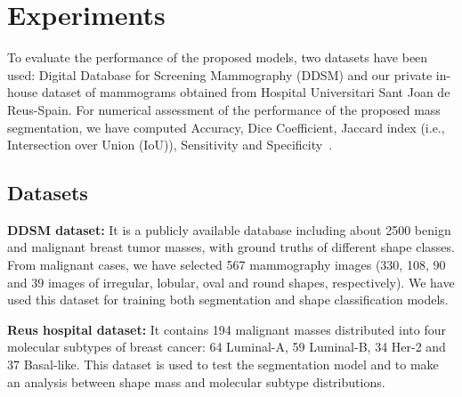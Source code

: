 \documentclass[runningheads,a4paper]{llncs}
\begin{document}
\section{Experiments}

To evaluate the performance of the proposed models, two datasets have been used: Digital Database for Screening Mammography (DDSM) \cite{heath2000digital} and our private in-house dataset of mammograms obtained from Hospital Universitari Sant Joan de Reus-Spain. For numerical assessment of the performance of the proposed mass segmentation, we have computed Accuracy, Dice Coefficient, Jaccard index (i.e., Intersection over Union (IoU)), Sensitivity and Specificity~\cite{vacavant2012benchmark}.

\subsection{Datasets}
\textbf{DDSM dataset:} It is a publicly available database including about 2500 benign and malignant breast tumor masses, with ground truths of different shape classes. From malignant cases, we have selected 567 mammography images (330, 108, 90 and 39 images of irregular, lobular, oval and round shapes, respectively). We have used this dataset for training both segmentation and shape classification models.

\textbf{Reus hospital dataset:} It contains 194 malignant masses distributed into four molecular subtypes of breast cancer: 64 Luminal-A, 59 Luminal-B, 34 Her-2 and 37 Basal-like. This dataset is used to test the segmentation model and to make an analysis between shape mass and molecular subtype distributions.
\end{document}
